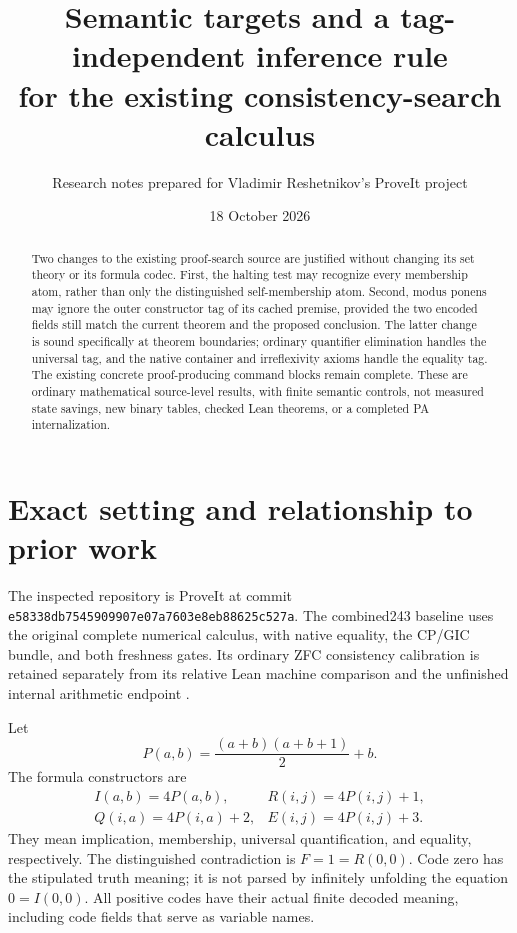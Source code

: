 \documentclass[11pt]{article}
\title{Semantic targets and a tag-independent inference rule\\
for the existing consistency-search calculus}
\author{Research notes prepared for Vladimir Reshetnikov's ProveIt project}
\date{18 October 2026}
\begin{document}
\maketitle

\begin{abstract}
Two changes to the existing proof-search source are justified without changing
its set theory or its formula codec. First, the halting test may recognize every
membership atom, rather than only the distinguished self-membership atom.
Second, modus ponens may ignore the outer constructor tag of its cached premise,
provided the two encoded fields still match the current theorem and the proposed
conclusion. The latter change is sound specifically at theorem boundaries;
ordinary quantifier elimination handles the universal tag, and the native
container and irreflexivity axioms handle the equality tag. The existing concrete
proof-producing command blocks remain complete. These are ordinary mathematical
source-level results, with finite semantic controls, not measured state savings,
new binary tables, checked Lean theorems, or a completed PA internalization.
\end{abstract}

\section{Exact setting and relationship to prior work}

The inspected repository is ProveIt at commit
\texttt{e58338db7545909907e07a7603e8eb88625c527a}.
The combined243 baseline uses the original complete numerical calculus, with
native equality, the CP/GIC bundle, and both freshness gates. Its ordinary
ZFC consistency calibration is retained separately from its relative Lean
machine comparison and the unfinished internal arithmetic endpoint
\cite{combined,native}.

Let
\[
 P(a,b)=\frac{(a+b)(a+b+1)}2+b.
\]
The formula constructors are
\[
 \begin{array}{ll}
 I(a,b)=4P(a,b),& R(i,j)=4P(i,j)+1,\\
 Q(i,a)=4P(i,a)+2,& E(i,j)=4P(i,j)+3.
 \end{array}
\]
They mean implication, membership, universal quantification, and equality,
respectively. The distinguished contradiction is
\(F=1=R(0,0)\). Code zero has the stipulated truth meaning; it is not parsed
by infinitely unfolding the equation \(0=I(0,0)\).
All positive codes have their actual finite decoded meaning, including code
fields that serve as variable names.
\end{document}

